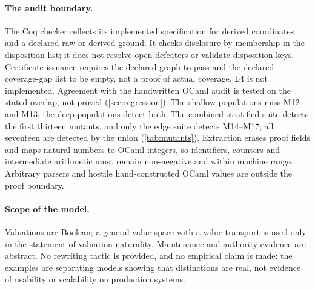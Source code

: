 \paragraph{The audit boundary.}
The Coq checker reflects its implemented specification for derived coordinates and a declared raw or derived ground. It checks disclosure by membership in the disposition list; it does not resolve open defeaters or validate disposition keys. Certificate issuance requires the declared graph to pass and the declared coverage-gap list to be empty, not a proof of actual coverage. L4 is not implemented. Agreement with the handwritten OCaml audit is tested on the stated overlap, not proved (\cref{sec:regression}). The shallow populations miss M12 and M13; the deep populations detect both. The combined stratified suite detects the first thirteen mutants, and only the edge suite detects M14--M17; all seventeen are detected by the union (\cref{tab:mutants}). Extraction erases proof fields and maps natural numbers to OCaml integers, so identifiers, counters and intermediate arithmetic must remain non-negative and within machine range. Arbitrary parsers and hostile hand-constructed OCaml values are outside the proof boundary.

\paragraph{Scope of the model.}
Valuations are Boolean; a general value space with a value transport is used only in the statement of valuation naturality. Maintenance and authority evidence are abstract. No rewriting tactic is provided, and no empirical claim is made: the examples are separating models showing that distinctions are real, not evidence of usability or scalability on production systems.
